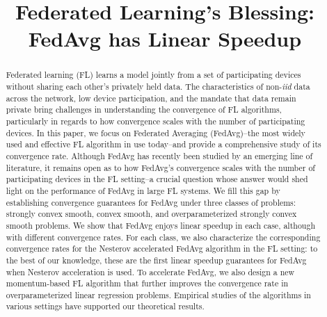 \documentclass{article}
\title{Federated Learning's Blessing:\\
FedAvg has Linear Speedup}
\author{}
\begin{document}
\maketitle

\begin{abstract}
Federated learning (FL) learns a model jointly from a set of participating devices without sharing each other's privately held data. The characteristics of non-\textit{iid} data across the network, low device participation, and the mandate that data remain private bring challenges in understanding the convergence of FL algorithms, particularly in regards to how convergence scales with the number of participating devices. In this paper, we focus on Federated Averaging (FedAvg)--the most widely used and effective FL algorithm in use today--and provide a comprehensive study of its convergence rate. Although FedAvg has recently been studied by an emerging line of literature, it remains open as to how FedAvg's convergence scales with the number of participating devices in the FL setting--a crucial question whose answer would shed light on the performance of FedAvg in large FL systems. We fill this gap by establishing convergence guarantees for FedAvg under three classes of problems: strongly convex smooth, convex smooth, and overparameterized strongly convex smooth problems. We show that FedAvg enjoys linear speedup in each case, although with different convergence rates. For each class, we also characterize the corresponding convergence rates for the Nesterov accelerated FedAvg algorithm in the FL setting: to the best of our knowledge, these are the first linear speedup guarantees for FedAvg when Nesterov acceleration is used. To accelerate FedAvg, we also design a new momentum-based FL algorithm that further improves the convergence rate in overparameterized linear regression problems. Empirical studies of the algorithms in various settings have supported our theoretical results.
\end{abstract}


%






% 


\newpage




\newpage
\appendix

\end{document}
